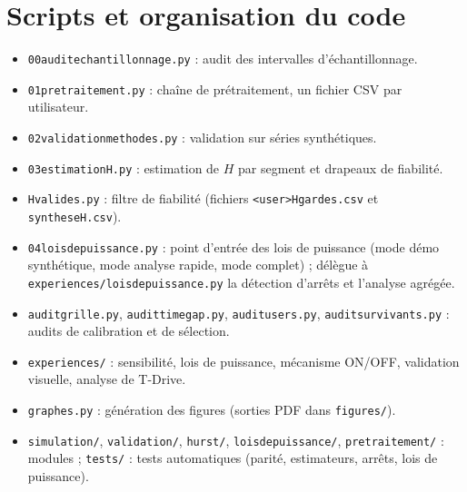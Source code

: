 \documentclass[11pt,a4paper]{article}
\newcommand{\code}[1]{\texttt{#1}}
\renewcommand{\_}{\textunderscore\penalty0\hspace{0pt}}
\begin{document}
\section{Scripts et organisation du code}
\label{app:scripts}

\begin{itemize}
  \item \code{00\_audit\_echantillonnage.py} : audit des intervalles d'échantillonnage.
  \item \code{01\_pretraitement.py} : chaîne de prétraitement, un fichier CSV par utilisateur.
  \item \code{02\_validation\_methodes.py} : validation sur séries synthétiques.
  \item \code{03\_estimation\_H.py} : estimation de $H$ par segment et drapeaux de fiabilité.
  \item \code{H\_valides.py} : filtre de fiabilité (fichiers \code{<user>\_H\_gardes.csv} et
  \code{synthese\_H.csv}).
  \item \code{04\_lois\_de\_puissance.py} : point d'entrée des lois de puissance (mode démo
  synthétique, mode analyse rapide, mode complet) ; délègue à
  \code{experiences/lois\_de\_puissance.py} la détection d'arrêts et l'analyse agrégée.
  \item \code{audit\_grille.py}, \code{audit\_time\_gap.py}, \code{audit\_users.py},
  \code{audit\_survivants.py} : audits de calibration et de sélection.
  \item \code{experiences/} : sensibilité, lois de puissance, mécanisme ON/OFF, validation
  visuelle, analyse de T-Drive.
  \item \code{graphes.py} : génération des figures (sorties PDF dans \code{figures/}).
  \item \code{simulation/}, \code{validation/}, \code{hurst/}, \code{lois\_de\_puissance/},
  \code{pretraitement/} : modules ; \code{tests/} : tests automatiques (parité, estimateurs,
  arrêts, lois de puissance).
\end{itemize}
\end{document}
